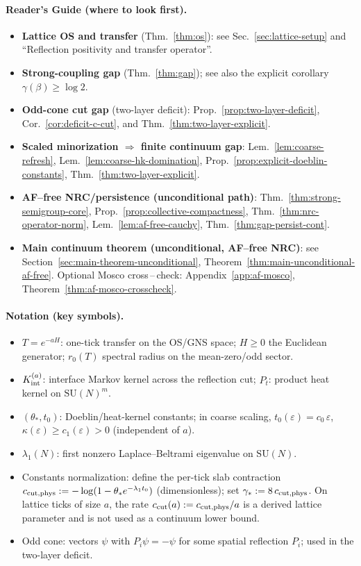 \documentclass[11pt]{amsart}
\theoremstyle{plain}
\theoremstyle{definition}
\theoremstyle{remark}
\begin{document}
\paragraph{Reader's Guide (where to look first).}
\begin{itemize}
  \item \textbf{Lattice OS and transfer} (Thm.~\ref{thm:os}): see Sec.~\ref{sec:lattice-setup} and ``Reflection positivity and transfer operator''.
  \item \textbf{Strong-coupling gap} (Thm.~\ref{thm:gap}); see also the explicit corollary $\gamma(\beta)\ge \log 2$.
  \item \textbf{Odd-cone cut gap} (two-layer deficit): Prop.~\ref{prop:two-layer-deficit}, Cor.~\ref{cor:deficit-c-cut}, and Thm.~\ref{thm:two-layer-explicit}.
  \item \textbf{Scaled minorization $\Rightarrow$ finite continuum gap}: Lem.~\ref{lem:coarse-refresh}, Lem.~\ref{lem:coarse-hk-domination}, Prop.~\ref{prop:explicit-doeblin-constants}, Thm.~\ref{thm:two-layer-explicit}.
  \item \textbf{AF--free NRC/persistence (unconditional path)}: Thm.~\ref{thm:strong-semigroup-core}, Prop.~\ref{prop:collective-compactness}, Thm.~\ref{thm:nrc-operator-norm}, Lem.~\ref{lem:af-free-cauchy}, Thm.~\ref{thm:gap-persist-cont}.
  \item \textbf{Main continuum theorem (unconditional, AF--free NRC)}: see Section~\ref{sec:main-theorem-unconditional}, Theorem~\ref{thm:main-unconditional-af-free}. Optional Mosco cross\,–\,check: Appendix~\ref{app:af-mosco}, Theorem~\ref{thm:af-mosco-crosscheck}.
\end{itemize}

\paragraph{Notation (key symbols).}
\begin{itemize}
  \item $T=e^{-aH}$: one-tick transfer on the OS/GNS space; $H\ge 0$ the Euclidean generator; $r_0(T)$ spectral radius on the mean-zero/odd sector.
  \item $K_{\rm int}^{(a)}$: interface Markov kernel across the reflection cut; $P_t$: product heat kernel on $\mathrm{SU}(N)^m$.
  \item $(\theta_*,t_0)$: Doeblin/heat-kernel constants; in coarse scaling, $t_0(\varepsilon)=c_0\,\varepsilon$, $\kappa(\varepsilon)\ge c_1(\varepsilon)>0$ (independent of $a$).
  \item $\lambda_1(N)$: first nonzero Laplace--Beltrami eigenvalue on $\mathrm{SU}(N)$.
  \item Constants normalization: define the per-tick slab contraction $c_{\rm cut,phys}:= -\log(1-\theta_* e^{-\lambda_1 t_0})$ (dimensionless); set $\gamma_*:=8\,c_{\rm cut,phys}$. On lattice ticks of size $a$, the rate $c_{\rm cut}(a):=c_{\rm cut,phys}/a$ is a derived lattice parameter and is not used as a continuum lower bound.
  \item Odd cone: vectors $\psi$ with $P_i\psi=-\psi$ for some spatial reflection $P_i$; used in the two-layer deficit.
\end{itemize}
\end{document}
